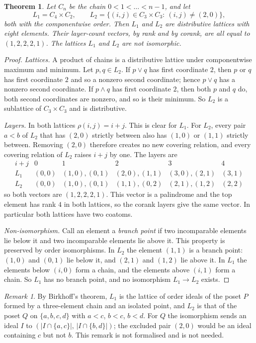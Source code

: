 \documentclass[11pt]{article}
\newtheorem{theorem}{Theorem}
\theoremstyle{remark}
\newtheorem*{remark}{Remark}
\begin{document}
\begin{theorem}
Let $C_n$ be the chain $0<1<\dots<n-1$, and let
\[
 L_1=C_4\times C_2,\qquad
 L_2=\{(i,j)\in C_3\times C_3:\ (i,j)\ne(2,0)\},
\]
both with the componentwise order. Then $L_1$ and $L_2$ are distributive
lattices with eight elements. Their layer-count vectors, by rank and by
corank, are all equal to $(1,2,2,2,1)$. The lattices $L_1$ and $L_2$ are
not isomorphic.
\end{theorem}
\begin{proof}
\emph{Lattices.} A product of chains is a distributive lattice under
componentwise maximum and minimum. Let $p,q\in L_2$. If $p\vee q$ has
first coordinate $2$, then $p$ or $q$ has first coordinate $2$ and so a
nonzero second coordinate; hence $p\vee q$ has a nonzero second
coordinate. If $p\wedge q$ has first coordinate $2$, then both $p$ and
$q$ do, both second coordinates are nonzero, and so is their minimum.
So $L_2$ is a sublattice of $C_3\times C_3$ and is distributive.

\emph{Layers.} In both lattices $\rho(i,j)=i+j$. This is clear for
$L_1$. For $L_2$, every pair $a<b$ of $L_2$ that has $(2,0)$ strictly
between also has $(1,0)$ or $(1,1)$ strictly between. Removing $(2,0)$
therefore creates no new covering relation, and every covering relation
of $L_2$ raises $i+j$ by one. The layers are
\[
\begin{array}{c|ccccc}
 i+j&0&1&2&3&4\\\hline
 L_1&(0,0)&(1,0),(0,1)&(2,0),(1,1)&(3,0),(2,1)&(3,1)\\
 L_2&(0,0)&(1,0),(0,1)&(1,1),(0,2)&(2,1),(1,2)&(2,2)
\end{array}
\]
so both vectors are $(1,2,2,2,1)$. This vector is a palindrome and the
top element has rank $4$ in both lattices, so the corank layers give the
same vector. In particular both lattices have two coatoms.

\emph{Non-isomorphism.} Call an element a \emph{branch point} if two
incomparable elements lie below it and two incomparable elements lie
above it. This property is preserved by order isomorphisms. In $L_2$ the
element $(1,1)$ is a branch point: $(1,0)$ and $(0,1)$ lie below it, and
$(2,1)$ and $(1,2)$ lie above it. In $L_1$ the elements below $(i,0)$
form a chain, and the elements above $(i,1)$ form a chain. So $L_1$ has
no branch point, and no isomorphism $L_1\to L_2$ exists.
\end{proof}

\begin{remark}
By Birkhoff's theorem, $L_1$ is the lattice of order ideals of the
poset $P$ formed by a three-element chain and an isolated point, and
$L_2$ is that of the poset $Q$ on $\{a,b,c,d\}$ with $a<c$, $b<c$,
$b<d$. For $Q$ the isomorphism sends an ideal $I$ to
$(|I\cap\{a,c\}|,\,|I\cap\{b,d\}|)$; the excluded pair $(2,0)$ would be
an ideal containing $c$ but not $b$. This remark is not formalised and
is not needed.
\end{remark}
\end{document}
